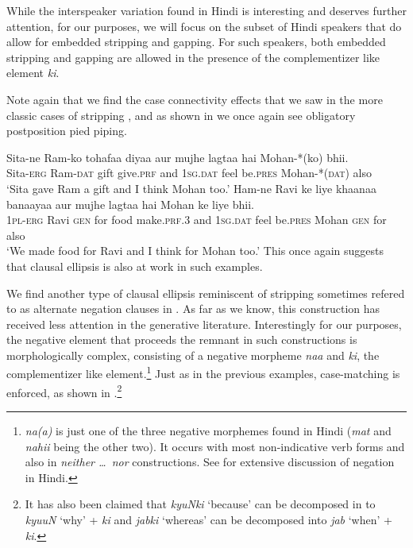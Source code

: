 \documentclass[output=paper]{langscibook}
\begin{document}
While the interspeaker variation found in Hindi is interesting and deserves further attention, for our purposes, we will focus on the subset of Hindi speakers that do allow for embedded stripping and gapping. For such speakers, both embedded stripping and gapping are allowed in the presence of the complementizer like element \emph{ki}.

Note again that we find the case connectivity effects that we saw in the more classic cases of stripping , and as shown in  we once again see obligatory postposition pied piping.

\ea 
    \ea \label{maex15:a}
        \gll Sita-ne Ram-ko tohafaa diyaa aur mujhe lagtaa hai Mohan-*(ko) bhii.\\
        Sita-\textsc{erg} Ram-\textsc{dat} gift give.\textsc{prf} and \textsc{1sg.dat} feel be.\textsc{pres} Mohan-*(\textsc{dat}) also\\
        \glt `Sita gave Ram a gift and I think Mohan too.'
    \ex \label{maex15:b}
        \gll Ham-ne Ravi ke liye khaanaa banaayaa aur mujhe lagtaa hai Mohan ke liye bhii.\\
        \textsc{1pl-erg} Ravi \textsc{gen} for food make.\textsc{prf.3} and \textsc{1sg.dat} feel be.\textsc{pres} Mohan \textsc{gen} for also\\
        \glt `We made food for Ravi and I think for Mohan too.'
    \z 
\z 
This once again suggests that clausal ellipsis is also at work in such examples.

We find another type of clausal ellipsis reminiscent of stripping sometimes refered to as  alternate negation clauses in \citet{Sinha05}. As far as we know, this construction has received less attention in the generative literature.  Interestingly for our purposes, the negative element that proceeds the remnant in such constructions is morphologically complex, consisting of a negative morpheme \emph{naa} and \emph{ki}, the complementizer like element.\footnote{\emph{na(a)} is just one of the three negative morphemes found in Hindi (\emph{mat} and \emph{nahii} being the other two). It occurs with most non-indicative verb forms and also in \emph{neither \dots\ nor} constructions. See \citealt{bhatia95} for extensive discussion of negation in Hindi.} Just as in the previous examples, case-matching is enforced, as shown in .\footnote{It has also been claimed that \emph{kyuNki} `because' can be decomposed in to \emph{kyuuN} `why' + \emph{ki} and \emph{jabki} `whereas' can be decomposed into \emph{jab} `when' + \emph{ki}.}
\end{document}
